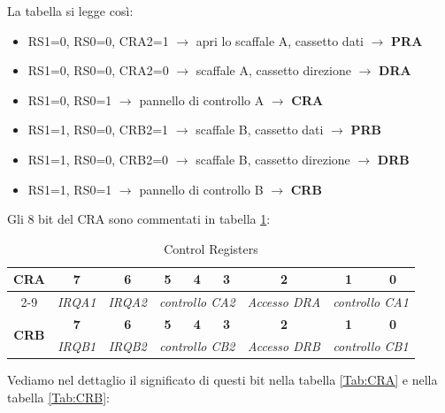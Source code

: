 La tabella si legge così:
\begin{itemize}
    \item RS1=0, RS0=0, CRA2=1 $\rightarrow$ apri lo scaffale A, cassetto dati $\rightarrow$ \textbf{PRA}
    \item RS1=0, RS0=0, CRA2=0 $\rightarrow$ scaffale A, cassetto direzione $\rightarrow$ \textbf{DRA}
    \item RS1=0, RS0=1 $\rightarrow$ pannello di controllo A $\rightarrow$ \textbf{CRA}
    \item RS1=1, RS0=0, CRB2=1 $\rightarrow$ scaffale B, cassetto dati $\rightarrow$ \textbf{PRB}
    \item RS1=1, RS0=0, CRB2=0 $\rightarrow$ scaffale B, cassetto direzione $\rightarrow$ \textbf{DRB}
    \item RS1=1, RS0=1 $\rightarrow$ pannello di controllo B $\rightarrow$ \textbf{CRB}
\end{itemize}


Gli 8 bit del CRA sono commentati in tabella \ref{Tab:control_registers}:

\begin{table}[H]
    \centering
    \renewcommand{\arraystretch}{1.5} %
    \setlength{\tabcolsep}{8pt} %
    \begin{tabular}{|c|c|c|c|c|c|c|c|c|}
        \hline
        \multirow{2}{*}{\textbf{CRA}} 
        & \textbf{7}  & \textbf{6}  & \textbf{5}  & \textbf{4}  & \textbf{3}  & \textbf{2}  & \textbf{1}  & \textbf{0}  \\ 
        \cline{2-9} 
        & \textit{IRQA1}  & \textit{IRQA2}  
        & \multicolumn{3}{c|}{\textit{controllo CA2}}  
        & \textit{Accesso DRA}  
        & \multicolumn{2}{c|}{\textit{controllo CA1}}  \\ 
        \hline
        \multirow{2}{*}{\textbf{CRB}}  
        & \textbf{7}  & \textbf{6}  & \textbf{5}  & \textbf{4}  & \textbf{3}  & \textbf{2}  & \textbf{1}  & \textbf{0}  \\ 
        \cline{2-9} 
        & \textit{IRQB1}  & \textit{IRQB2}  
        & \multicolumn{3}{c|}{\textit{controllo CB2}}  
        & \textit{Accesso DRB}  
        & \multicolumn{2}{c|}{\textit{controllo CB1}}  \\ 
        \hline
    \end{tabular}
    \caption{Control Registers}
    \label{Tab:control_registers}
\end{table}

Vediamo nel dettaglio il significato di questi bit nella tabella \ref{Tab:CRA} e nella tabella \ref{Tab:CRB}:

